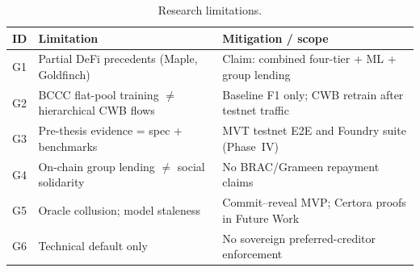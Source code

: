 \begin{table}[H]
\centering
\caption[Research limitations]{Research limitations.}
\label{tab:research-limitations}
\small
\begin{tabular}{@{}p{1.0cm}p{3.2cm}p{8.0cm}@{}}
\toprule
\tableheadcolor
\textbf{ID} & \textbf{Limitation} & \textbf{Mitigation / scope} \\
\midrule
G1 & Partial DeFi precedents (Maple, Goldfinch) & Claim: combined four-tier + ML + group lending \\
G2 & BCCC flat-pool training $\neq$ hierarchical CWB flows & Baseline F1 only; CWB retrain after testnet traffic \\
G3 & Pre-thesis evidence = spec + benchmarks & MVT testnet E2E and Foundry suite (Phase~IV) \\
G4 & On-chain group lending $\neq$ social solidarity & No BRAC/Grameen repayment claims \\
G5 & Oracle collusion; model staleness & Commit--reveal MVP; Certora proofs in Future Work \\
G6 & Technical default only & No sovereign preferred-creditor enforcement \\
\bottomrule
\end{tabular}
\end{table}



